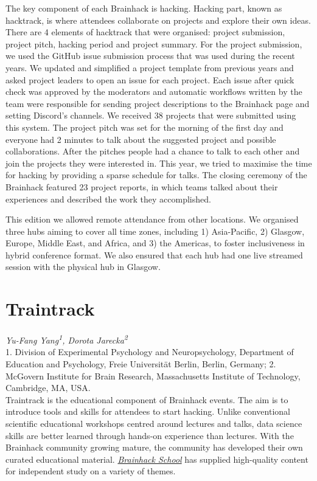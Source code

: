\documentclass[10pt,a4paper,twocolumns]{proc}
\newcommand{\authors}[1]{\emph{\footnotesize #1} \\}
\newcommand{\affiliations}[1]{{\scriptsize #1} \\}
\begin{document}
The key component of each Brainhack is hacking. Hacking part, known as
hacktrack, is where attendees collaborate on projects and explore their
own ideas. There are 4 elements of hacktrack that were organised:
project submission, project pitch, hacking period and project summary.
For the project submission, we used the GitHub issue submission process
that was used during the recent years. We updated and simplified a
project template from previous years and asked project leaders to open
an issue for each project. Each issue after quick check was approved by
the moderators and automatic workflows written by the team were
responsible for sending project descriptions to the Brainhack page and
setting Discord's channels. We received 38 projects that were submitted
using this system. The project pitch was set for the morning of the
first day and everyone had 2 minutes to talk about the suggested project
and possible collaborations. After the pitches people had a chance to
talk to each other and join the projects they were interested in. This
year, we tried to maximise the time for hacking by providing a sparse
schedule for talks. The closing ceremony of the Brainhack featured 23
project reports, in which teams talked about their experiences and
described the work they accomplished.

This edition we allowed remote attendance from other locations. We
organised three hubs aiming to cover all time zones, including 1)
Asia-Pacific, 2) Glasgow, Europe, Middle East, and Africa, and 3) the
Americas, to foster inclusiveness in hybrid conference format. We also
ensured that each hub had one live streamed session with the physical
hub in Glasgow.

\section{Traintrack}
\authors{Yu-Fang Yang\textsuperscript{1}, %
Dorota Jarecka\textsuperscript{2}}
%
\affiliations{1. Division of Experimental Psychology and Neuropsychology, Department of Education and Psychology, Freie Universität Berlin, Berlin, Germany; %
2. McGovern Institute for Brain Research, Massachusetts Institute of Technology, Cambridge, MA, USA.}

Traintrack is the educational component of Brainhack events. The aim is
to introduce tools and skills for attendees to start hacking. Unlike
conventional scientific educational workshops centred around lectures
and talks, data science skills are better learned through hands-on
experience than lectures. With the Brainhack community growing mature,
the community has developed their own curated educational material.
\href{https://school.brainhackmtl.org/}{\emph{Brainhack School}} has
supplied high-quality content for independent study on a variety of
themes.
\end{document}
